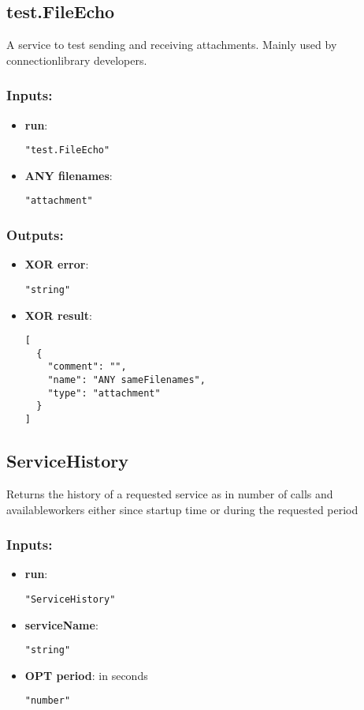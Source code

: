 \subsection{test.FileEcho}
A service to test sending and receiving attachments. Mainly used by connectionlibrary developers.
\subsubsection*{Inputs:}
\begin{itemize}
    \item \textbf{run}: 
\begin{lstlisting}
"test.FileEcho"
\end{lstlisting}
    \item \textbf{ANY filenames}: 
\begin{lstlisting}
"attachment"
\end{lstlisting}
  \end{itemize}

\subsubsection*{Outputs:}
\begin{itemize}
    \item \textbf{XOR error}: 
\begin{lstlisting}
"string"
\end{lstlisting}
    \item \textbf{XOR result}: 
\begin{lstlisting}
[
  {
    "comment": "", 
    "name": "ANY sameFilenames", 
    "type": "attachment"
  }
]
\end{lstlisting}
  \end{itemize}

\subsection{ServiceHistory}
Returns
 the history of a requested service as in number of calls and 
availableworkers either since startup time or during the requested 
period
\subsubsection*{Inputs:}
\begin{itemize}
    \item \textbf{run}: 
\begin{lstlisting}
"ServiceHistory"
\end{lstlisting}
    \item \textbf{serviceName}: 
\begin{lstlisting}
"string"
\end{lstlisting}
    \item \textbf{OPT period}: in seconds
\begin{lstlisting}
"number"
\end{lstlisting}
  \end{itemize}

